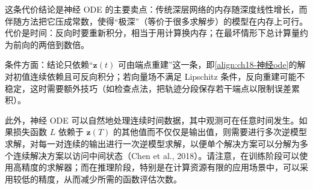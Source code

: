 \documentclass[../../main.tex]{subfiles}
\begin{document}
\begin{remark}
这条代价结论是神经 ODE 的主要卖点：传统深层网络的内存随深度线性增长，而伴随方法把它压成常数，使得“极深”（等价于很多求解步）的模型在内存上可行。代价是时间：反向时要重新积分，相当于用计算换内存；在最坏情形下总计算量约为前向的两倍到数倍。

条件方面：结论只依赖“$\bm{z}(t)$ 可由端点重建”这一条，即\eqref{align:ch18-神经ode}的解对初值连续依赖且可反向积分；若向量场不满足 Lipschitz 条件，反向重建可能不稳定，这时需要额外技巧（如检查点法，把轨迹分段保存若干端点以限制误差累积）。
\end{remark}

此外，神经 ODE 可以自然地处理连续时间数据，其中观测可在任意时间发生。如果损失函数 $L$ 依赖于 $\bm{z}(T)$ 的其他值而不仅仅是输出值，则需要进行多次逆模型求解，对每一对连续的输出进行一次逆模型求解，以便单个解决方案可以分解为多个连续解决方案以访问中间状态（Chen et al., 2018）。请注意，在训练阶段可以使用高精度的求解器；而在推理阶段，特别是在计算资源有限的应用场景中，可以采用较低的精度，从而减少所需的函数评估次数。
\end{document}

